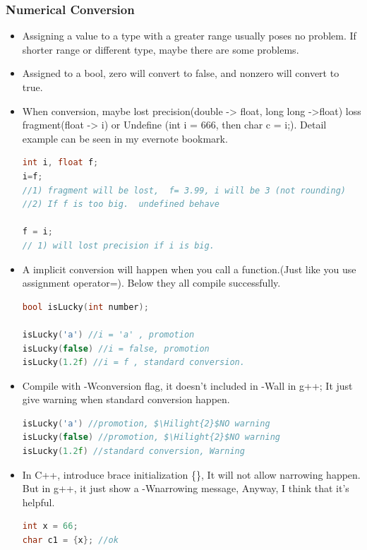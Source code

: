 \documentclass[a4paper,12pt,twoside]{book}
\newcommand{\Hilight}[1]{\makebox[0pt][l]{\color{yellow}\rule[-3pt]{#1em}{11pt}}}
\begin{document}
\subsubsection{Numerical Conversion}
\begin{itemize}
\item Assigning a value to a type with a greater range usually poses no problem. If shorter range or different type, maybe there are some problems.

\item Assigned to a bool, zero will convert to false, and nonzero will convert to true.

\item When conversion, maybe lost precision(double -> float, long long ->float) loss fragment(float -> i) or Undefine (int i = 666, then char c = i;). Detail example can be seen in my evernote bookmark.
\begin{lstlisting}[frame=single, language=c++]
int i, float f;
i=f;
//1) fragment will be lost,  f= 3.99, i will be 3 (not rounding)
//2) If f is too big.  undefined behave

f = i;
// 1) will lost precision if i is big.
\end{lstlisting}

\item A implicit conversion will happen when you call a function.(Just like you use assignment operator=). Below they all compile successfully. 
\begin{lstlisting}[frame=single, language=c++]
bool isLucky(int number);

isLucky('a') //i = 'a' , promotion
isLucky(false) //i = false, promotion
isLucky(1.2f) //i = f , standard conversion.
\end{lstlisting}

\item Compile with -Wconversion flag, it doesn't included in -Wall in g++; It just give warning when standard conversion happen. 

\begin{lstlisting}[frame=single, language=c++, mathescape=true]
isLucky('a') //promotion, $\Hilight{2}$NO warning
isLucky(false) //promotion, $\Hilight{2}$NO warning
isLucky(1.2f) //standard conversion, Warning
\end{lstlisting}

\item In C++, introduce brace initialization \{\}, It will not allow narrowing happen. But in g++, it just show a -Wnarrowing message, Anyway, I think that it's helpful.
\begin{lstlisting}[frame=single, language=c++]
int x = 66;
char c1 = {x}; //ok


\end{lstlisting}
\end{itemize}
\end{document}
